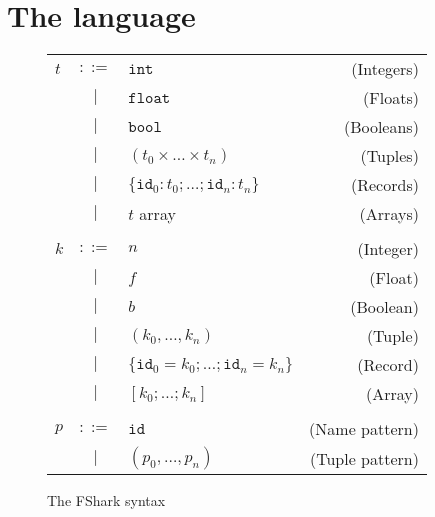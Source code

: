 \chapter{The \fshark{} language}
\label{chap:fsharklanguage}


\begin{figure}
  \centering
  \begin{tabular}{lclr}
    $t$ & $::=$ & $\texttt{int}$ & (Integers) \\
        & $|$   & $\texttt{float}$ & (Floats) \\
        & $|$   & $\texttt{bool}$ & (Booleans) \\
        & $|$   & $(t_0 \times \ldots \times t_n)$ & (Tuples) \\
        & $|$   & $\{\texttt{id}_0:t_0 ; \ldots ; \texttt{id}_n:t_n\}$ & (Records) \\
        & $|$   & $t$ array & (Arrays) \\
    \\

    $k$ & $::=$ & $n$ & (Integer) \\
        & $|$   & $f$ & (Float) \\
        & $|$   & $b$ & (Boolean) \\
        & $|$   & $(k_0 , \ldots , k_n)$ & (Tuple) \\
        & $|$   & $\{\texttt{id}_0=k_0 ; \ldots ; \texttt{id}_n=k_n\}$ & (Record) \\
        & $|$   & $[k_0 ; \ldots ; k_n]$ & (Array) \\
    \\

    $p$ & $::=$ & $\texttt{id}$ & (Name pattern) \\
        & $|$   & $(p_0, \ldots, p_n)$ & (Tuple pattern) \\
  \end{tabular}
  \caption{The FShark syntax}
\end{figure}

